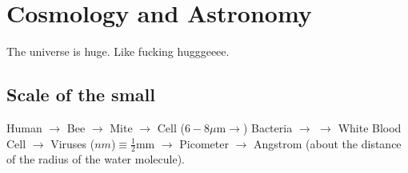 \documentclass{article}
\begin{document}

\section{Cosmology and Astronomy}



The universe is huge. Like fucking hugggeeee. 


\subsection{Scale of the small}

Human \( \to  \) Bee \( \longrightarrow  \) Mite \( \to  \) Cell (\( 6-8 \mu  \text{m} \longrightarrow  \)) Bacteria \( \longrightarrow  \) \( \longrightarrow  \) White Blood Cell \( \longrightarrow  \)  Viruses (\( nm \))\( \equiv \frac{1}{2}\text{mm}\) \( \longrightarrow  \) Picometer \( \longrightarrow  \) Angstrom (about the distance of the radius of the water molecule). 
\end{document}
